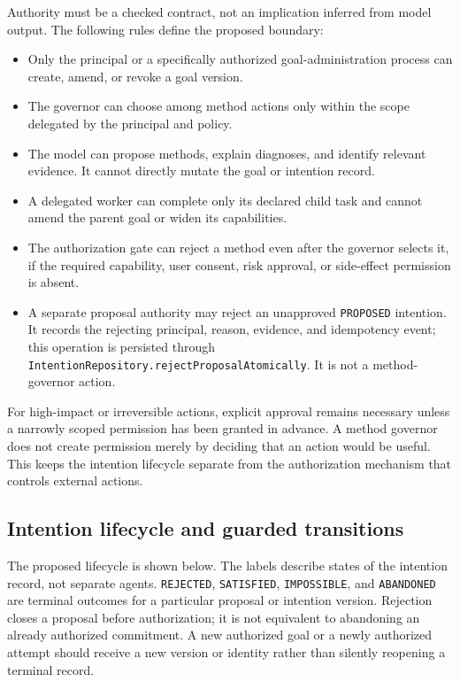 Authority must be a checked contract, not an implication inferred from model output. The following rules define the proposed boundary:

\begin{itemize}
  \item Only the principal or a specifically authorized goal-administration process can create, amend, or revoke a goal version.
  \item The governor can choose among method actions only within the scope delegated by the principal and policy.
  \item The model can propose methods, explain diagnoses, and identify relevant evidence. It cannot directly mutate the goal or intention record.
  \item A delegated worker can complete only its declared child task and cannot amend the parent goal or widen its capabilities.
  \item The authorization gate can reject a method even after the governor selects it, if the required capability, user consent, risk approval, or side-effect permission is absent.
  \item A separate proposal authority may reject an unapproved \texttt{PROPOSED} intention. It records the rejecting principal, reason, evidence, and idempotency event; this operation is persisted through \texttt{IntentionRepository.rejectProposalAtomically}. It is not a method-governor action.
\end{itemize}

For high-impact or irreversible actions, explicit approval remains necessary unless a narrowly scoped permission has been granted in advance. A method governor does not create permission merely by deciding that an action would be useful. This keeps the intention lifecycle separate from the authorization mechanism that controls external actions.

\subsection{Intention lifecycle and guarded transitions}

The proposed lifecycle is shown below. The labels describe states of the intention record, not separate agents. \texttt{REJECTED}, \texttt{SATISFIED}, \texttt{IMPOSSIBLE}, and \texttt{ABANDONED} are terminal outcomes for a particular proposal or intention version. Rejection closes a proposal before authorization; it is not equivalent to abandoning an already authorized commitment. A new authorized goal or a newly authorized attempt should receive a new version or identity rather than silently reopening a terminal record.

